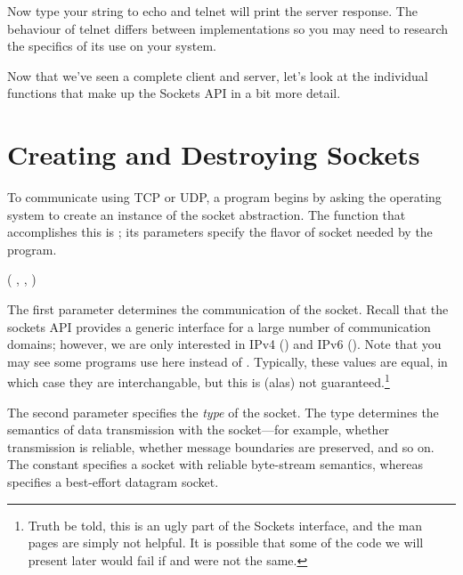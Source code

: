 \begin{shell}
\prompt {}
\end{shell}

\noindent  Now type your string to echo and telnet will print the server
response.  The behaviour of telnet differs between implementations so
you may need to research the specifics of its use on your system.

Now that we've seen a complete client and server, let's look at
the individual functions that make up the Sockets API in a bit more detail.

\section{Creating and Destroying Sockets}

\noindent To communicate using TCP or UDP, a program begins by asking
the operating system to create an instance of the socket abstraction.
The function that accomplishes this is ;
its parameters specify the flavor of socket needed by the program.

\begin{inlinefcn}
 ( , 
 ,  )
\end{inlinefcn}

\noindent The first parameter determines the communication  of
the socket.  Recall that the sockets API provides a generic interface
for a large number of communication domains; however, we are only interested
in IPv4 () and IPv6 ().  Note that you
may see some programs use  here instead of
.  Typically, these values are equal, in which case they are
interchangable, but this is (alas) not guaranteed.\footnote{Truth be
told, this is an ugly part of the Sockets interface, and the man pages
are simply not helpful.  It is possible that some 
of the code we will present later would fail if  and
 were not the same.}

The second parameter specifies the \emph{type} of the socket.  The
type determines the semantics of data transmission with the
socket---for example, whether transmission is reliable, whether
message boundaries are preserved, and so on.  The constant
 specifies a socket with reliable byte-stream
semantics, whereas  specifies a best-effort
datagram socket.

